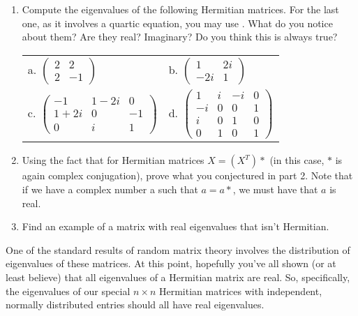 {\begin{minipage}{43em}
\begin{enumerate}[1.]
\item Compute the eigenvalues of the following Hermitian matrices. For the last one, as it involves a quartic equation, you may use . What do you notice about them? Are they real? Imaginary? Do you think this is always true?
\begin{center}
\begin{tabular}{ll}
a. $\begin{pmatrix} 2 & 2 \\ 2 & -1 \end{pmatrix}$ & b. $\begin{pmatrix} 1 & 2i \\ -2i & 1 \end{pmatrix}$ \\
c. $\begin{pmatrix} -1 & 1-2i & 0 \\ 1+2i & 0 & -1 \\ 0 & i & 1\end{pmatrix}$ & d. $\begin{pmatrix}1 & i & -i & 0 \\ -i & 0 & 0 & 1 \\ i & 0 & 1 & 0 \\ 0 & 1 & 0 & 1\end{pmatrix}$
\end{tabular}
\end{center}

\item Using the fact that for Hermitian matrices $X=(X^T)*$ (in this case, $*$ is again complex conjugation), prove what you conjectured in part 2. Note that if we have a complex number a such that $a=a*$, we must have that $a$ is real.

\item Find an example of a matrix with real eigenvalues that isn't Hermitian.

\end{enumerate}
\end{minipage}} \vspace{0.2cm}

One of the standard results of random matrix theory involves the distribution of eigenvalues of these matrices. At this point, hopefully you've all shown (or at least believe) that all eigenvalues of a Hermitian matrix are real. So, specifically, the eigenvalues of our special $n \times n$ Hermitian matrices with independent, normally distributed entries should all have real eigenvalues. \\

